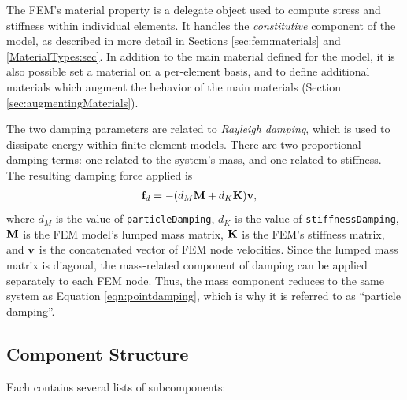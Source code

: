 The FEM's {\sf material} property is a delegate object used to compute
stress and stiffness within individual elements.  It handles
the \emph{constitutive} component of the model, as described in more
detail in Sections \ref{sec:fem:materials}
and \ref{MaterialTypes:sec}.
In addition to the main material defined
for the model, it is also possible set a material on a per-element
basis, and to define additional materials which augment the behavior
of the main materials (Section \ref{sec:augmentingMaterials}).

The two damping parameters are related to \emph{Rayleigh damping}, which
is used to dissipate energy within finite element models.  There are two 
proportional damping terms: one related to the system's mass, and one related 
to stiffness.  The resulting damping force applied is
\begin{align}
	{\bf f}_d & = - (d_M {\bf M} + d_K{\bf K}){\bf v},
\end{align}
where $d_M$ is the value of {\tt particleDamping}, $d_K$ is the value of 
{\tt stiffnessDamping}, ${\bf M}$ is the FEM model's lumped mass matrix, ${\bf K}$ is 
the FEM's stiffness matrix, and ${\bf v}$ is the concatenated vector of FEM node
velocities.  Since the lumped mass matrix is diagonal, the mass-related
component of damping can be applied separately to each FEM node.  Thus, the
mass component reduces to the same system as Equation \eqref{eqn:pointdamping},
which is why it is referred to as ``particle damping''.

\subsection{Component Structure}
\label{sec:componentStructure}

Each  contains several 
lists of subcomponents:


